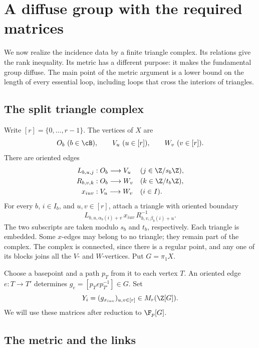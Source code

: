 \section{A diffuse group with the required matrices}\label{sec:geometry}

We now realize the incidence data by a finite triangle complex. Its
relations give the rank inequality. Its metric has a different purpose:
it makes the fundamental group diffuse. The main point of the metric
argument is a lower bound on the length of every essential loop,
including loops that cross the interiors of triangles.

\subsection{The split triangle complex}

Write \([r]=\{0,\ldots,r-1\}\). The vertices of \(X\) are
\[
 O_b\ (b\in\cB),\qquad V_u\ (u\in[r]),\qquad W_v\ (v\in[r]).
\]
There are oriented edges
\[
 \begin{aligned}
 L_{b,u,j}&:O_b\longrightarrow V_u &&(j\in\Z/s_b\Z),\\
 R_{b,v,k}&:O_b\longrightarrow W_v &&(k\in\Z/t_b\Z),\\
 x_{iuv}&:V_u\longrightarrow W_v &&(i\in I).
 \end{aligned}
\]
For every \(b\), \(i\in I_b\), and \(u,v\in[r]\), attach a triangle
with oriented boundary
\begin{equation}\label{eq:triangle-relation}
 L_{b,u,\alpha_b(i)+v}\,x_{iuv}\,
 R_{b,v,\beta_b(i)+u}^{-1}.
\end{equation}
The two subscripts are taken modulo \(s_b\) and \(t_b\), respectively.
Each triangle is embedded. Some \(x\)-edges may belong to no triangle;
they remain part of the complex. The complex is connected, since there
is a regular point, and any one of its blocks joins all the \(V\)- and
\(W\)-vertices. Put \(G=\pi_1X\).

Choose a basepoint and a path \(p_T\) from it to each vertex \(T\).
An oriented edge \(e:T\to T'\) determines
\(g_e=[p_T e p_{T'}^{-1}]\in G\). Set
\begin{equation}\label{eq:line-matrix}
 Y_i=(g_{x_{iuv}})_{u,v\in[r]}\in M_r(\Z[G]).
\end{equation}
We will use these matrices after reduction to \(\F_p[G]\).

\subsection{The metric and the links}

